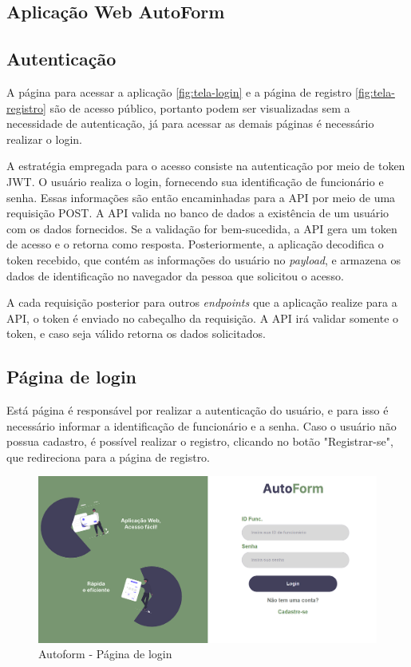 \subsection{Aplicação Web AutoForm}

\subsection{Autenticação}

A página para acessar a aplicação \autoref{fig:tela-login} e a página de registro \autoref{fig:tela-registro} são de acesso público, portanto podem ser visualizadas sem a necessidade de autenticação, já para acessar as demais páginas é necessário realizar o login.

A estratégia empregada para o acesso consiste na autenticação por meio de token JWT. O usuário realiza o login, fornecendo sua identificação de funcionário e senha. Essas informações são então encaminhadas para a API por meio de uma requisição POST. 
A API valida no banco de dados a existência de um usuário com os dados fornecidos. 
Se a validação for bem-sucedida, a API gera um token de acesso e o retorna como resposta. Posteriormente, a aplicação decodifica o token recebido, que contém as informações do usuário no \textit{payload}, e armazena os dados de identificação no navegador da pessoa que solicitou o acesso.

A cada requisição posterior para outros \textit{endpoints} que a aplicação realize para a API, o token é enviado no cabeçalho da requisição. A API irá validar somente o token, e caso seja válido retorna os dados solicitados.

\subsection{Página de login}
Está página é responsável por realizar a autenticação do usuário, e para isso é necessário informar a identificação de funcionário e a senha. Caso o usuário não possua cadastro, é possível realizar o registro, clicando no botão "Registrar-se", que redireciona para a página de registro.

\begin{figure}[htb]
    \caption{\label{fig:tela-login}Autoform - Página de login}
    \begin{center}
        \includegraphics[scale=0.5]{imagens/login-autoform.png}
    \end{center}
\end{figure}


